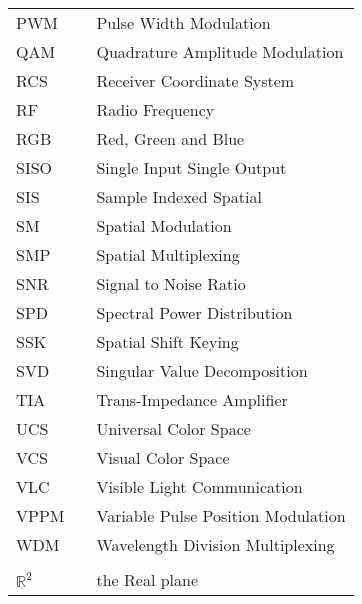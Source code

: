 \begin{center}
\begin{longtable}{lll}
		PWM & \dotfill & Pulse Width Modulation \\
		QAM & \dotfill & Quadrature Amplitude Modulation \\
		RCS & \dotfill & Receiver Coordinate System \\
    RF  & \dotfill & Radio Frequency \\
		RGB & \dotfill & Red, Green and Blue \\
		SISO & \dotfill & Single Input Single Output \\
		SIS & \dotfill & Sample Indexed Spatial \\
		SM & \dotfill & Spatial Modulation \\
		SMP & \dotfill & Spatial Multiplexing \\
		SNR & \dotfill & Signal to Noise Ratio \\
		SPD & \dotfill & Spectral Power Distribution \\
		SSK & \dotfill & Spatial Shift Keying \\
		SVD & \dotfill & Singular Value Decomposition \\
		TIA & \dotfill & Trans-Impedance Amplifier \\
		UCS & \dotfill & Universal Color Space \\
		VCS & \dotfill & Visual Color Space \\
    VLC  & \dotfill & Visible Light Communication \\
		VPPM & \dotfill & Variable Pulse Position Modulation \\
		WDM & \dotfill & Wavelength Division Multiplexing \\
		& \dotfill & \\
    $\mathbb{R}^{2}$  & \dotfill & the Real plane \\
  \end{longtable}
\end{center}